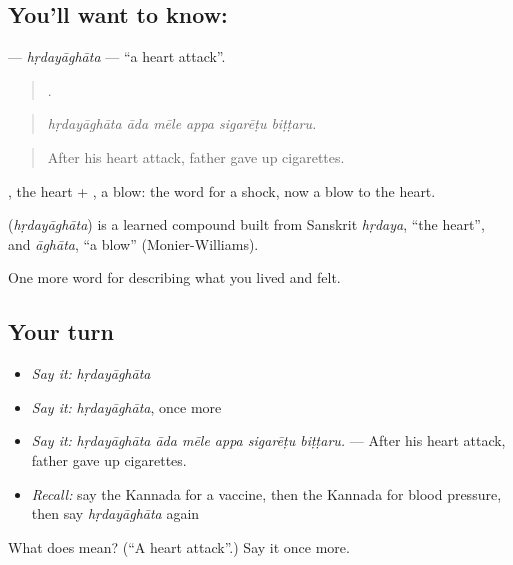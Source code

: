 \subsection*{You'll want to know: }
\textbf{} — \emph{hṛdayāghāta} — \textquotedblleft{}a heart attack\textquotedblright{}.

\begin{quote}
     .
\end{quote}

\begin{quote}
\emph{hṛdayāghāta āda mēle appa sigarēṭu biṭṭaru.}
\end{quote}

\begin{quote}
After his heart attack, father gave up cigarettes.
\end{quote}

, the heart + , a blow: the word for a shock, now a blow to the heart.

\begin{cousinweb}
\textbf{} (\emph{hṛdayāghāta}) is a learned compound built from Sanskrit \emph{hṛdaya}, \textquotedblleft{}the heart\textquotedblright{}, and \emph{āghāta}, \textquotedblleft{}a blow\textquotedblright{} (Monier-Williams).
\end{cousinweb}

\begin{grammarlens}[title={What you've built}]
One more word for describing what you lived and felt.
\end{grammarlens}

\subsection*{Your turn}
\begin{itemize}
\raggedright
  \item \emph{Say it:} \emph{hṛdayāghāta}
  \item \emph{Say it:} \emph{hṛdayāghāta}, once more
  \item \emph{Say it:} \emph{hṛdayāghāta āda mēle appa sigarēṭu biṭṭaru.} — After his heart attack, father gave up cigarettes.
  \item \emph{Recall:} say the Kannada for a vaccine, then the Kannada for blood pressure, then say \emph{hṛdayāghāta} again
\end{itemize}

\begin{tcolorbox}[breakable,colback=teal!4,colframe=teal!35!black,title={Before you move on}]
What does  mean? (\textquotedblleft{}A heart attack\textquotedblright{}.) Say it once more.
\end{tcolorbox}

